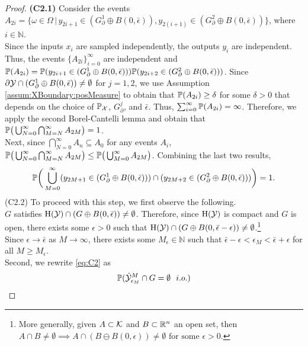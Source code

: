 \documentclass[12pt]{l4dc2022} %
\begin{document}
\begin{proof}
% 
\textbf{(C2.1) }
Consider the events $A_{2i}=\{\omega\in\Omega\,|\,
y_{2i+1}\in (G_\partial^1\oplus B(0,\bar{\epsilon})),
y_{2(i+1)}\in (G_\partial^2\oplus B(0,\bar{\epsilon}))\}$, where $i\in\mathbb{N}$.
\\
Since the inputs $x_i$ are sampled independently, the outputs $y_i$ are independent. Thus, 
the events $\{A_{2i}\}_{i=0}^\infty$ 
are independent and  
$\mathbb{P}(A_{2i})=
\mathbb{P}(y_{2i+1}\in (G_\partial^1\oplus B(0,\bar{\epsilon})))
\mathbb{P}(y_{2i+2}\in (G_\partial^2\oplus B(0,\bar{\epsilon})))$. 
Since $\partial\mathcal{Y}\cap (G_\partial^1\oplus B(0,\bar{\epsilon})) \neq \emptyset$ for $j=1,2$, we use Assumption \ref{assum:XBoundary:posMeasure} to obtain that $\mathbb{P}(A_{2i}) \geq \delta$ for some $\delta>0$ that depends on the choice of $\mathbb{P}_{\mathcal{X}}$, $G_\partial^j$, and $\bar\epsilon$. 
Thus, 
$\sum_{i=0}^\infty\mathbb{P}(A_{2i})=\infty$. Therefore, we apply the second Borel-Cantelli lemma and obtain that 
$
\mathbb{P}\big(\bigcup_{N=0}^\infty\bigcap_{M=N}^\infty A_{2M}\big) = 1$.
% 
\\
% 
Next, since $\bigcap_{N=0}^\infty A_n \subseteq A_0$ for any events $A_i$, 
$\mathbb{P}\big(\bigcup_{N=0}^\infty\bigcap_{M=N}^\infty A_{2M}\big) 
 \leq 
 \mathbb{P}\big(\bigcup_{M=0}^\infty A_{2M}\big) $. 
 Combining the last two results, 
\begin{equation}\label{eq:prob_union_xm_in_G_equals_1}
\mathbb{P}
\bigg(
	\bigcup_{M=0}^\infty 
(y_{2M+1}\in (G_\partial^1\oplus B(0,\bar{\epsilon})))
\cap 
(y_{2M+2}\in (G_\partial^2\oplus B(0,\bar{\epsilon})))
\bigg) = 1.
\end{equation}
% 
% 
% 
(C2.2) To proceed with this step, we first observe the following. 
\\
$G$ satisfies 
$\textrm{H}(\mathcal{Y})\cap (G\oplus B(0,\bar{\epsilon}))\neq \emptyset$. Therefore, since $\textrm{H}(\mathcal{Y})$ is compact and $G$ is open, there exists some $\epsilon>0$ such that  
$\textrm{H}(\mathcal{Y})\cap (G\oplus B(0,\bar{\epsilon}-\epsilon))\neq \emptyset$.\footnote{More generally, given $A\subset\mathcal{K}$ and $B\subset\mathbb{R}^n$ an open set, then 
$
A\cap B \neq\emptyset\implies A\cap(B\ominus B(0,\epsilon))\neq\emptyset \text{ for some $\epsilon>0$.}$}
\\
Since $\epsilon\rightarrow\bar{\epsilon}$ as $M\rightarrow\infty$, 
there exists some $M_\epsilon\in\mathbb{N}$ such that $\bar{\epsilon}-\epsilon<\epsilon_M<\bar{\epsilon}+\epsilon$ for all $M\geq M_\epsilon$. 
\\
Second, we rewrite \eqref{eq:C2} as
\begin{align}
\Prob(\hat\Y^M_{\epsilon_M}\cap G = \emptyset \ \ i.o.)

\end{align}
\end{proof}
\end{document}

